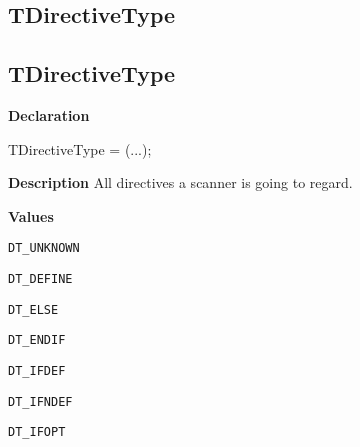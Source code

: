 \documentclass{report}
\newif\ifpdf
\begin{document}
\subsection*{\large{\textbf{TDirectiveType}}\normalsize\hspace{1ex}\hrulefill}
\else
\subsection*{TDirectiveType}
\fi
\label{PasDoc_Scanner-TDirectiveType}
\begin{list}{}{
\setlength{\itemindent}{0cm}
\setlength{\listparindent}{0cm}
\setlength{\leftmargin}{\evensidemargin}
\addtolength{\leftmargin}{\tmplength}
\settowidth{\labelsep}{X}
\addtolength{\leftmargin}{\labelsep}
\setlength{\labelwidth}{\tmplength}
}
\item[\textbf{Declaration}\hfill]
\ifpdf
\begin{flushleft}
\fi
\begin{ttfamily}
TDirectiveType = (...);\end{ttfamily}

\ifpdf
\end{flushleft}
\fi

\par
\item[\textbf{Description}]
All directives a scanner is going to regard.\item[\textbf{Values}]
\begin{description}
\item[\texttt{DT{\_}UNKNOWN}] \label{PasDoc_Scanner-DT_UNKNOWN}
\index{}
 
\item[\texttt{DT{\_}DEFINE}] \label{PasDoc_Scanner-DT_DEFINE}
\index{}
 
\item[\texttt{DT{\_}ELSE}] \label{PasDoc_Scanner-DT_ELSE}
\index{}
 
\item[\texttt{DT{\_}ENDIF}] \label{PasDoc_Scanner-DT_ENDIF}
\index{}
 
\item[\texttt{DT{\_}IFDEF}] \label{PasDoc_Scanner-DT_IFDEF}
\index{}
 
\item[\texttt{DT{\_}IFNDEF}] \label{PasDoc_Scanner-DT_IFNDEF}
\index{}
 
\item[\texttt{DT{\_}IFOPT}] \label{PasDoc_Scanner-DT_IFOPT}
\index{}
 

\end{description}
\end{list}
\end{document}
